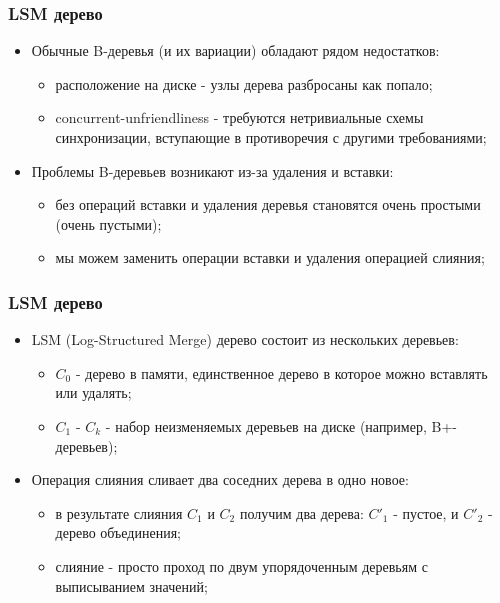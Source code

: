 \begin{frame}
\frametitle{LSM дерево}
\begin{itemize}
  \item<1-> Обычные B-деревья (и их вариации) обладают рядом недостатков:
    \begin{itemize}
      \item расположение на диске - узлы дерева разбросаны как попало;
      \item concurrent-unfriendliness - требуются нетривиальные схемы синхронизации, вступающие в противоречия с другими требованиями;
    \end{itemize}
  \item<2-> Проблемы B-деревьев возникают из-за удаления и вставки:
    \begin{itemize}
      \item без операций вставки и удаления деревья становятся очень простыми (очень пустыми);
      \item мы можем заменить операции вставки и удаления операцией слияния;
    \end{itemize}
\end{itemize}
\end{frame}

\begin{frame}
\frametitle{LSM дерево}
\begin{itemize}
  \item<1-> LSM (Log-Structured Merge) дерево состоит из нескольких деревьев:
    \begin{itemize}
      \item $C_0$ - дерево в памяти, единственное дерево в которое можно вставлять или удалять;
      \item $C_1$ - $C_k$ - набор неизменяемых деревьев на диске (например, B+-деревьев);
    \end{itemize}
  \item<2-> Операция слияния сливает два соседних дерева в одно новое:
    \begin{itemize}
      \item в результате слияния $C_1$ и $C_2$ получим два дерева: $C'_1$ - пустое, и $C'_2$ - дерево объединения;
      \item слияние - просто проход по двум упорядоченным деревьям с выписыванием значений;
    \end{itemize}
\end{itemize}
\end{frame}

